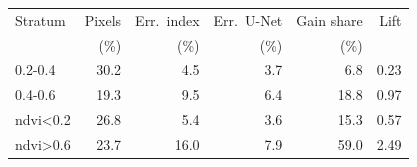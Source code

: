 \begin{tabular}{@{}lrrrrr@{}}
\toprule
Stratum & Pixels & Err.\ index & Err.\ U-Net & Gain share & Lift \\
 & (\%) & (\%) & (\%) & (\%) & \\
\midrule
0.2-0.4 & 30.2 & 4.5 & 3.7 & 6.8 & 0.23 \\
0.4-0.6 & 19.3 & 9.5 & 6.4 & 18.8 & 0.97 \\
ndvi<0.2 & 26.8 & 5.4 & 3.6 & 15.3 & 0.57 \\
ndvi>0.6 & 23.7 & 16.0 & 7.9 & 59.0 & 2.49 \\
\bottomrule
\end{tabular}